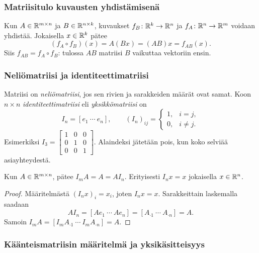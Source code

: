 \documentclass[11pt,a4paper]{amsart}
\begin{document}
  \subsubsection*{Matriisitulo kuvausten yhdistämisenä}

  Kun $A\in\mathbb{R}^{m\times n}$ ja $B\in\mathbb{R}^{n\times k}$, kuvaukset
  $f_B\colon\mathbb{R}^k\to\mathbb{R}^n$ ja $f_A\colon\mathbb{R}^n\to\mathbb{R}^m$ voidaan
  yhdistää. Jokaisella $x\in\mathbb{R}^k$ pätee
  \[
    (f_A\circ f_B)(x)=A(Bx)=(AB)x=f_{AB}(x).
  \]
  Siis $\boxed{f_{AB}=f_A\circ f_B}$: tulossa $AB$ matriisi $B$
  vaikuttaa vektoriin ensin.

  \subsubsection*{Neliömatriisi ja identiteettimatriisi}

  \begin{definition}
    Matriisi on \emph{neliömatriisi}, jos sen rivien ja sarakkeiden
    määrät ovat samat. Koon $n\times n$ \emph{identiteettimatriisi}
    eli \emph{yksikkömatriisi} on
    \[
      I_n=[e_1\ \cdots\ e_n],\qquad
      (I_n)_{ij}=
      \begin{cases}1,&i=j,\\0,&i\ne j.
      \end{cases}
    \]
    Esimerkiksi $I_3=\left[
      \begin{smallmatrix}
        1&0&0\\0&1&0\\0&0&1
    \end{smallmatrix}\right]$.
    Alaindeksi jätetään pois, kun koko selviää asiayhteydestä.
  \end{definition}

  \begin{lemma}
    Kun $A\in\mathbb{R}^{m\times n}$, pätee $I_mA=A=AI_n$.
    Erityisesti $I_nx=x$ jokaisella $x\in\mathbb{R}^n$.
  \end{lemma}
  \begin{proof}
    Määritelmästä $(I_nx)_i=x_i$, joten $I_nx=x$.
    Sarakkeittain laskemalla saadaan
    \[
      AI_n=[Ae_1\ \cdots\ Ae_n]
      =[A_{\cdot1}\ \cdots\ A_{\cdot n}]=A.
    \]
    Samoin $I_mA=[I_mA_{\cdot1}\ \cdots\ I_mA_{\cdot n}]=A$.
  \end{proof}

  \subsubsection*{Käänteismatriisin määritelmä ja yksikäsitteisyys}
\end{document}
